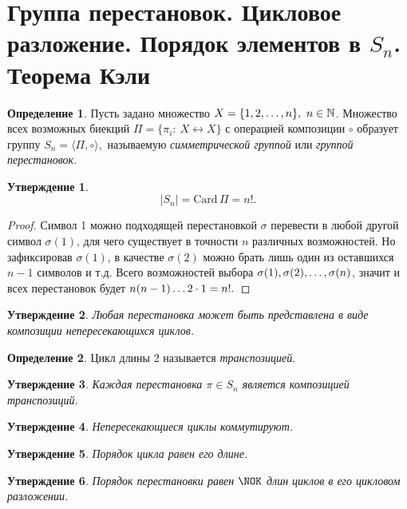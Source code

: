 \documentclass[a4paper, 14pt]{extarticle}
\newcommand{\naturals}{\mathbb{N}}
\theoremstyle{definition}
\newtheorem{definition}{Определение}
\theoremstyle{plain}
\numberwithin{theorem}{section}
\numberwithin{definition}{section}
\newtheorem{statement}{Утверждение}
\numberwithin{statement}{section}
\numberwithin{lemma}{section}
\numberwithin{consequence}{section}
\begin{document}
	\section{Группа перестановок. Цикловое разложение. Порядок элементов в $S_n$. Теорема Кэли}
		\setcounter{definition}{0}
		\begin{definition}
			Пусть задано множество ${X = \{1, 2, \mathellipsis, n\}, \ n \in \naturals}$. Множество всех возможных биекций ${\Pi =\{\pi_i{:} \ X \leftrightarrow X\}}$ с операцией композиции $\circ$ образует группу ${S_n = \langle \Pi, \circ \rangle,}$ называемую \textit{симметрической группой} или \textit{группой перестановок}.
		\end{definition}
		\begin{statement}
			\begin{equation*}
				|S_n| = \mathrm{Card} \, \Pi = n!.
			\end{equation*}
		\end{statement}
		\begin{proof}
			Символ 1 можно подходящей перестановкой $\sigma$ перевести в любой другой символ ${\sigma(1)}$, для чего существует в точности $n$ различных возможностей. Но зафиксировав ${\sigma(1)}$, в качестве ${\sigma(2)}$ можно брать лишь один из оставшихся ${n - 1}$ символов и т.д. Всего возможностей выбора ${\sigma(1), \sigma(2), \mathellipsis, \sigma(n)}$, значит и всех перестановок будет ${n(n - 1) \mathellipsis 2 \cdot 1 = n!.}$
		\end{proof}
		\begin{statement}
			Любая перестановка может быть представлена в виде композиции непересекающихся циклов.
		\end{statement}
		\begin{definition}
			Цикл длины 2 называется \textit{транспозицией}.
		\end{definition}
		\begin{statement}
			Каждая перестановка ${\pi \in S_n}$ является композицией транспозиций.
		\end{statement}
		\begin{statement}
			Непересекающиеся циклы коммутируют.
		\end{statement}
		\begin{statement}
			Порядок цикла равен его длине.
		\end{statement}
		\begin{statement}
			Порядок перестановки равен $\NOK$ длин циклов в его цикловом разложении.
		\end{statement}
\end{document}

